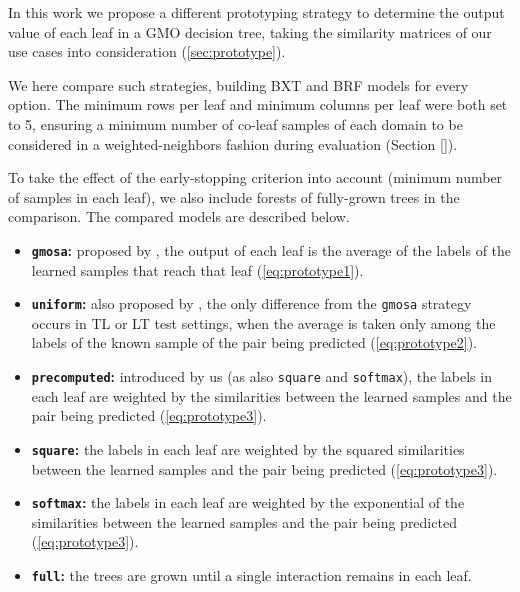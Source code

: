 In this work we propose a different prototyping strategy to determine the output value of each leaf in a GMO decision tree, taking the similarity matrices of our use cases into consideration (\autoref{sec:prototype}).

We here compare such strategies, building BXT and BRF models for every option. The minimum rows per leaf and minimum columns per leaf were both set to 5, ensuring a minimum number of co-leaf samples of each domain to be considered in a weighted-neighbors fashion during evaluation (Section \ref{}).

To take the effect of the early-stopping criterion into account (minimum number of samples in each leaf), we also include forests of fully-grown trees in the comparison. The compared models are described below.

\begin{itemize}
    \item \textbf{\texttt{gmosa}:} proposed by \textcite{pliakos2018global}, the output of each leaf is the average of the labels of the learned samples that reach that leaf (\autoref{eq:prototype1}).
    \item \textbf{\texttt{uniform}:} also proposed by \textcite{pliakos2018global}, the only difference from the \texttt{gmosa} strategy occurs in TL or LT test settings, when the average is taken only among the labels of the known sample of the pair being predicted (\autoref{eq:prototype2}).
    \item \textbf{\texttt{precomputed}:} introduced by us (as also \texttt{square} and \texttt{softmax}), the labels in each leaf are weighted by the similarities between the learned samples and the pair being predicted (\autoref{eq:prototype3}).
    \item \textbf{\texttt{square}:} the labels in each leaf are weighted by the squared similarities between the learned samples and the pair being predicted (\autoref{eq:prototype3}).
    \item \textbf{\texttt{softmax}:} the labels in each leaf are weighted by the exponential of the similarities between the learned samples and the pair being predicted (\autoref{eq:prototype3}).
    \item \textbf{\texttt{full}:} the trees are grown until a single interaction remains in each leaf. %
\end{itemize}


